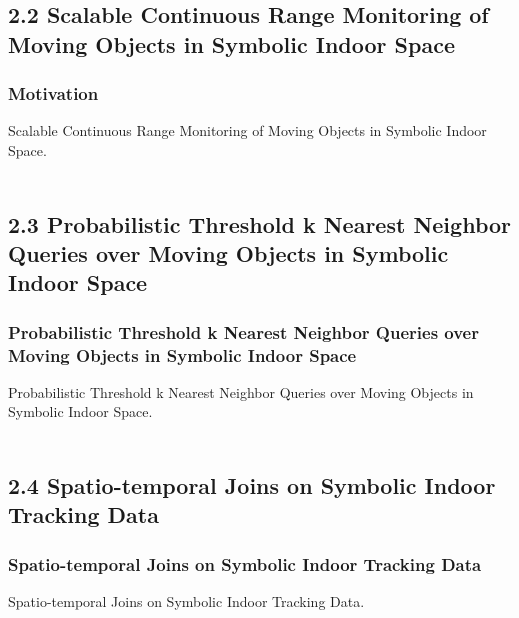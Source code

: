 \documentclass{beamer}
\begin{document}

\subsection{2.2 Scalable Continuous Range Monitoring of Moving Objects in Symbolic Indoor Space} %

\begin{frame}
\frametitle{Motivation}
Scalable Continuous Range Monitoring of Moving Objects in Symbolic Indoor Space.~\cite{DBLP:conf/cikm/YangLJ09}\\~\\


\end{frame}


\subsection{2.3 Probabilistic Threshold k Nearest Neighbor Queries over Moving Objects in Symbolic Indoor Space} %

\begin{frame}
\frametitle{Probabilistic Threshold k Nearest Neighbor Queries over Moving Objects in Symbolic Indoor Space}
Probabilistic Threshold k Nearest Neighbor Queries over Moving Objects in Symbolic Indoor Space.~\cite{DBLP:conf/edbt/YangLJ10}\\~\\


\end{frame}


\subsection{2.4 Spatio-temporal Joins on Symbolic Indoor Tracking Data} %

\begin{frame}
\frametitle{Spatio-temporal Joins on Symbolic Indoor Tracking Data}
Spatio-temporal Joins on Symbolic Indoor Tracking Data.~\cite{DBLP:conf/icde/LuYCJ11}\\~\\


\end{frame}
\end{document}
